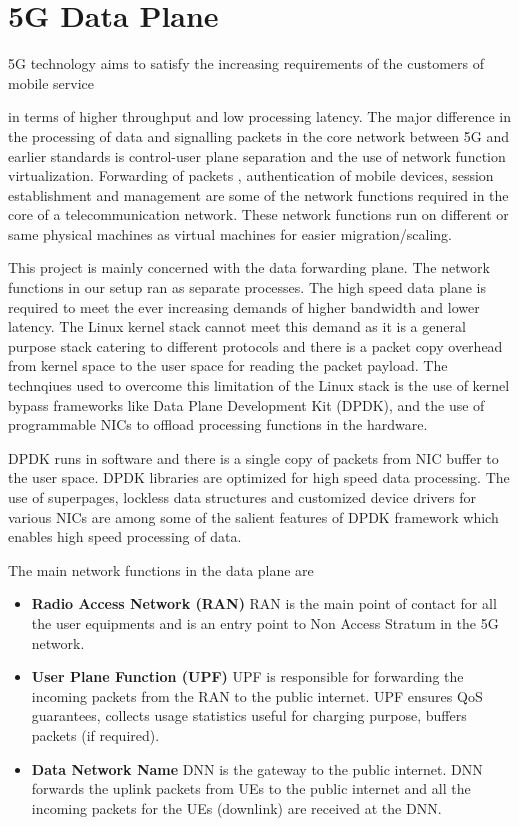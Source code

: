 \section{5G Data Plane \label{sec:5GDataPlane}}
5G technology aims to satisfy the increasing requirements of the customers of mobile service 

in terms of higher throughput and low processing latency. 
The major difference in  the processing of data and signalling packets in the core network between 5G and earlier standards is control-user plane 
separation and the use of network function virtualization. Forwarding of packets , 
authentication of mobile devices, session establishment and management  are some of the network functions required in the core of a telecommunication network. 
These network functions run on different or same physical machines as 
virtual machines for easier migration/scaling. 

This project is mainly concerned with the data forwarding plane. The network functions in our setup ran as separate processes.
The high speed data plane is required to meet the ever increasing demands of higher bandwidth and lower latency. The Linux kernel stack cannot meet this demand as it is a general purpose stack catering to different protocols and there is a packet copy overhead from kernel space to the user space for reading the packet payload. The technqiues used to overcome this limitation of the Linux stack is the use of kernel bypass frameworks like Data Plane Development Kit (DPDK), and the use of programmable NICs to offload processing functions in the hardware. 

DPDK runs in software and there is a single copy of packets from NIC buffer to the
 user space. DPDK libraries are optimized for high speed data processing. The use
  of superpages, lockless data structures and customized device drivers for
   various NICs are among some of the salient features of DPDK framework which
   enables high speed processing of data.

   The main network functions in the data plane are 
   \begin{itemize}
	   \item \textbf{Radio Access Network (RAN)} RAN is the main point of contact for all the user equipments and is an entry point to Non Access Stratum in the 5G network.
	   \item \textbf{User Plane Function (UPF)}
	   UPF is responsible for forwarding the incoming packets from the RAN to the public internet. UPF ensures QoS guarantees, collects usage statistics useful for charging purpose, buffers packets (if required).
	   
	   \item \textbf{Data Network Name}
	   DNN is the gateway to the public internet. DNN forwards the uplink packets from UEs to the public internet and all the incoming packets for the UEs (downlink) are received at the DNN.
   \end{itemize}
  
